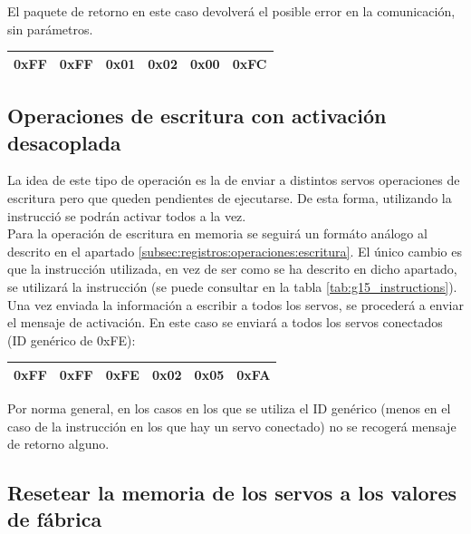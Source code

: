 	El paquete de retorno en este caso devolverá el posible error en la comunicación, sin parámetros.
	\begin{center}
		\begin{tabular}{|c|c|c|c|c|c|}
			\hline
			0xFF & 0xFF & 0x01 & 0x02 & 0x00 & 0xFC \\
			\hline
		\end{tabular}
	\end{center}
	
	\subsection{Operaciones de escritura con activación desacoplada}
		
		La idea de este tipo de operación es la de enviar a distintos servos operaciones de escritura pero que queden pendientes de ejecutarse. De esta forma, utilizando la instrucció  se podrán activar todos a la vez.
		\\ 
		
		Para la operación de escritura en memoria se seguirá un formáto análogo al descrito en el apartado \ref{subsec:registros:operaciones:escritura}. El único cambio es que la instrucción utilizada, en vez de ser  como se ha descrito en dicho apartado, se utilizará la instrucción  (se puede consultar en la tabla \ref{tab:g15_instructions}).
		\\ 
		
		Una vez enviada la información a escribir a todos los servos, se procederá a enviar el mensaje de activación. En este caso se enviará a todos los servos conectados (ID genérico de 0xFE):
		\begin{center}
			\begin{tabular}{|c|c|c|c|c|c|}
				\hline
				0xFF & 0xFF & 0xFE & 0x02 & 0x05 & 0xFA \\
				\hline
			\end{tabular}
		\end{center}
		
		Por norma general, en los casos en los que se utiliza el ID genérico (menos en el caso de la instrucción  en los que hay un servo conectado) no se recogerá mensaje de retorno alguno.
		
	\subsection{Resetear la memoria de los servos a los valores de fábrica}
	
